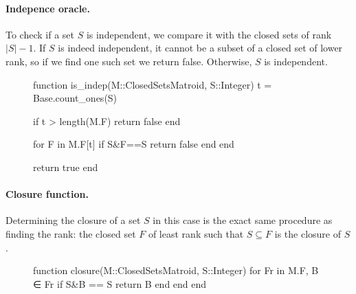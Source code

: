 \paragraph{Indepence oracle.} To check if a set $S$ is independent, we compare it with the closed sets of rank $|S|-1$. If $S$ is indeed independent, it cannot be a subset of a closed set of lower rank, so if we find one such set we return false. Otherwise, $S$ is independent.
\begin{figure}[ht!]
\begin{jllisting}
function is_indep(M::ClosedSetsMatroid, S::Integer)
  t = Base.count_ones(S)

  if t > length(M.F) return false end

  for F in M.F[t]
    if S&F==S return false end
  end

  return true
end
\end{jllisting}
\end{figure}

\paragraph{Closure function.} Determining the closure of a set $S$ in this case is the exact same procedure as finding the rank: the closed set $F$ of least rank such that $S\subseteq F$ is the closure of $S$.

\begin{figure}[ht!]
\begin{jllisting}
function closure(M::ClosedSetsMatroid, S::Integer)
  for Fr in M.F, B ∈ Fr
      if S&B == S return B end
  end
end
\end{jllisting}
\end{figure}